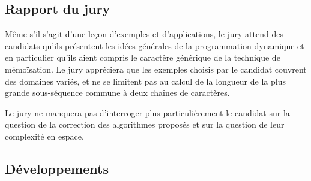 \documentclass[../../agregation.tex]{subfiles}
\begin{document}

\subsection{Rapport du jury}

\begin{aquote}{}
Même s'il s'agit d'une leçon d'exemples et d'applications, le jury attend des candidats qu'ils présentent les idées générales de la programmation dynamique et en particulier qu'ils aient compris le caractère générique de la technique de mémoïsation. Le jury appréciera que les exemples choisis par le candidat couvrent des domaines variés, et ne se limitent pas au calcul de la longueur de la plus grande sous-séquence commune à deux chaînes de caractères.


Le jury ne manquera pas d'interroger plus particulièrement le candidat sur la question de la correction des algorithmes proposés et sur la question de leur complexité en espace.
\end{aquote}

\subsection{Développements}

\dvts
\end{document}
